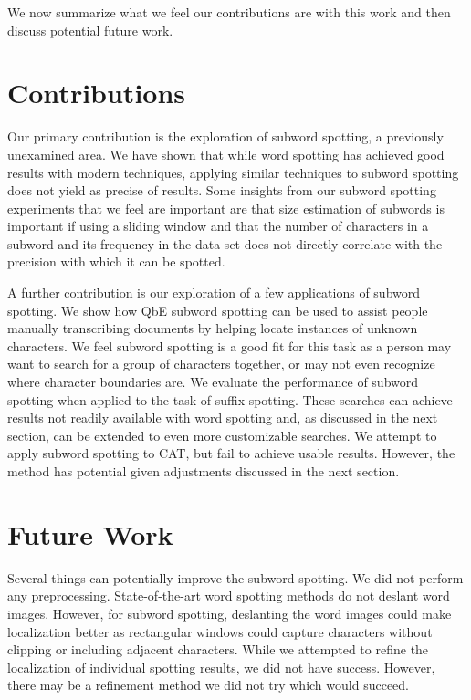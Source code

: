 \documentclass[ms,electronic,twosidetoc,letterpaper,chaptercenter,parttop,lof,lot]{byumsphd}
\begin{document}
We now summarize what we feel our contributions are with this work and then discuss potential future work.

\section{Contributions}


Our primary contribution is the exploration of subword spotting, a previously unexamined area. We have shown that while word spotting has achieved good results with modern techniques, applying similar techniques to subword spotting does not yield as precise of results.
Some insights from our subword spotting experiments that we feel are important are that 
size estimation of subwords is important if using a sliding window
and that
the number of characters in a subword  and its frequency in the data set does not directly correlate with the precision with which it can be spotted.

A further contribution is our exploration of a few applications of subword spotting.
We show how QbE subword spotting can be used to assist people manually transcribing documents by helping locate instances of unknown characters. We feel subword spotting is a good fit for this task as a person may want to search for a group of characters together, or may not even recognize where character boundaries are.
We evaluate the performance of subword spotting when applied to the task of suffix spotting. 
These searches can achieve results not readily available with word spotting and, as discussed in the next section, can be extended to even more customizable searches.
We attempt to apply subword spotting to CAT, but fail to achieve usable results. However, the method has potential given adjustments discussed in the next section.


\section{Future Work}



Several things can potentially improve the subword spotting. We did not perform any preprocessing. State-of-the-art word spotting methods do not deslant word images. However, for subword spotting, deslanting the word images could make localization better as rectangular windows could capture characters without clipping or including adjacent characters. While we attempted to refine the localization of individual spotting results, we did not have success. However, there may be a refinement method we did not try which would succeed.
\end{document}
